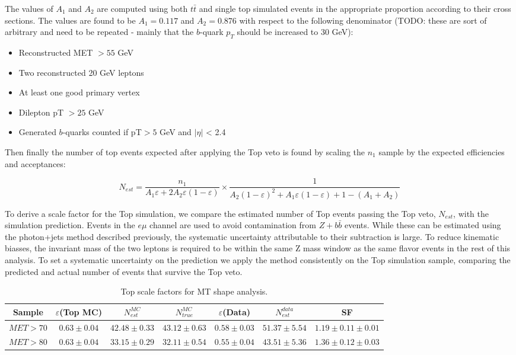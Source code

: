 The values of $A_1$ and $A_2$ are computed using both $t\bar{t}$ and single top simulated events
in the appropriate proportion according to their cross sections. The values are found to be
$A_1=0.117$ and $A_2=0.876$ with respect to the following denominator 
(TODO: these are sort of arbitrary and need to be repeated - mainly that the $b$-quark 
$p_{T}$ should be increased to 30 GeV):

\begin{itemize}
    \item Reconstructed MET $> 55$ GeV
    \item Two reconstructed 20 GeV leptons
    \item At least one good primary vertex
    \item Dilepton pT $> 25$ GeV
    \item Generated $b$-quarks counted if pT$>5$ GeV and $|\eta|$ < 2.4
\end{itemize}

Then finally the number of top events expected after applying the Top veto is found
by scaling the $n_{1}$ sample by the expected efficiencies and acceptances:

\begin{equation}
\label{eqn:topVetoYieldEst}
N_{est} = \frac{n_{1}} {A_{1}\varepsilon + 2A_{2}\varepsilon(1-\varepsilon)} \times \frac{1}{A_{2}(1-\varepsilon)^2 + A_{1}\varepsilon(1-\varepsilon) + 1-(A_{1}+A_{2})}
\end{equation}

To derive a scale factor for the Top simulation, we compare the estimated number of Top events
passing the Top veto, $N_{est}$, with the simulation prediction.
Events in the $e\mu$ channel are used to avoid contamination from $Z+b\bar{b}$ events.
While these can be estimated using the photon+jets method described previously,
the systematic uncertainty attributable to their subtraction is large.
To reduce kinematic biasses, the invariant mass of the two leptons is 
required to be within the same Z mass window as the same flavor events 
in the rest of this analysis.
To set a systematic uncertainty on the prediction we apply the method
consistently on the Top simulation sample, comparing the predicted and
actual number of events that survive the Top veto.

\begin{table}[!ht]
\begin{center}
\small{
\begin{tabular}{c|c|c|c|c|c|c}
\hline
Sample & $\varepsilon$(Top MC) & $N_{est}^{MC}$ & $N_{true}^{MC}$ & $\varepsilon$(Data) & $N_{est}^{data}$ & SF \\ \hline
$MET>70$  &  $0.63 \pm 0.04$  &  $42.48 \pm 0.33$  &  $43.12 \pm 0.63$  &  $0.58 \pm 0.03$  &  $51.37 \pm 5.54$  &  $1.19 \pm 0.11 \pm 0.01$ \\ \hline
$MET>80$  &  $0.63 \pm 0.04$  &  $33.15 \pm 0.29$  &  $32.11 \pm 0.54$  &  $0.55 \pm 0.04$  &  $43.51 \pm 5.36$  &  $1.36 \pm 0.12 \pm 0.03$ \\ \hline
\end{tabular}
\caption{Top scale factors for MT shape analysis.}
\label{tab:top_sf}}
\end{center}
\end{table}

